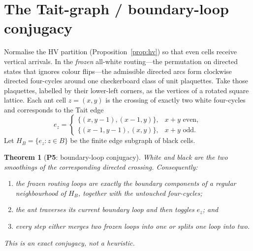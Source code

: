 \documentclass[11pt,reqno]{amsart}
\theoremstyle{plain}
\newtheorem{theorem}{Theorem}[section]
\theoremstyle{definition}
\newcommand{\PN}[1]{\textbf{P#1}}
\begin{document}
\section{The Tait-graph / boundary-loop conjugacy}\label{sec:tait}

Normalise the HV partition (Proposition~\ref{prop:hv}) so that even cells receive
vertical arrivals. In the \emph{frozen} all-white routing---the permutation on
directed states that ignores colour flips---the admissible directed arcs form
clockwise directed four-cycles around one checkerboard class of unit plaquettes.
Take those plaquettes, labelled by their lower-left corners, as the vertices of a
rotated square lattice. Each ant cell $z=(x,y)$ is the crossing of exactly two
white four-cycles and corresponds to the Tait edge
\begin{equation}\label{eq:tait}
e_z=\begin{cases}
\{(x,y-1),(x-1,y)\}, & x+y \text{ even},\\
\{(x-1,y-1),(x,y)\}, & x+y \text{ odd}.
\end{cases}
\end{equation}
Let $H_B=\{e_z:z\in B\}$ be the finite edge subgraph of black cells.

\begin{theorem}[\PN{5}: boundary-loop conjugacy]\label{thm:conjugacy}
White and black are the two smoothings of the corresponding directed crossing.
Consequently:
\begin{enumerate}[label=\textup{(\alph*)}]
\item the frozen routing loops are exactly the boundary components of a regular
neighbourhood of $H_B$, together with the untouched four-cycles;
\item the ant traverses its current boundary loop and then toggles $e_z$; and
\item every step either merges two frozen loops into one or splits one loop into
two.
\end{enumerate}
This is an exact conjugacy, not a heuristic.
\end{theorem}
\end{document}
